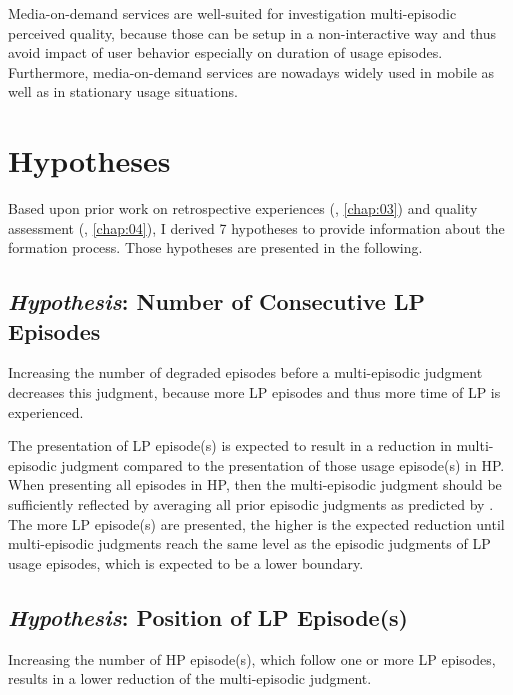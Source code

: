 Media-on-demand services are well-suited for investigation multi-episodic perceived quality, because those can be setup in a non-interactive way and thus avoid impact of user behavior especially on duration of usage episodes.
Furthermore, media-on-demand services are nowadays widely used in mobile as well as in stationary usage situations. 

\section{Hypotheses}
Based upon prior work on retrospective experiences (\cf, \autoref{chap:03}) and quality assessment (\cf, \autoref{chap:04}), I derived 7 hypotheses to provide information about the formation process.
Those hypotheses are presented in the following.

\subsection{\emph{Hypothesis}: Number of Consecutive \acs{LP} Episodes}
\begin{hypothesis}\label{hypo:number}
Increasing the number of degraded episodes before a multi-episodic judgment decreases this judgment, because more \ac{LP} episodes and thus more time of \ac{LP} is experienced.
\end{hypothesis}

The presentation of \ac{LP} episode(s) is expected to result in a reduction in multi-episodic judgment compared to the presentation of those usage episode(s) in \ac{HP}.
When presenting all episodes in \ac{HP}, then the multi-episodic judgment should be sufficiently reflected by averaging all prior episodic judgments as predicted by \citet{moller_single-call_2011}.
The more \ac{LP} episode(s) are presented, the higher is the expected reduction until multi-episodic judgments reach the same level as the episodic judgments of \ac{LP} usage episodes, which is expected to be a lower boundary.

\subsection{\emph{Hypothesis}: Position of \acs{LP} Episode(s)}
\begin{hypothesis}\label{hypo:position}
Increasing the number of \ac{HP} episode(s), which follow one or more \ac{LP} episodes, results in a lower reduction of the multi-episodic judgment.
\end{hypothesis}

